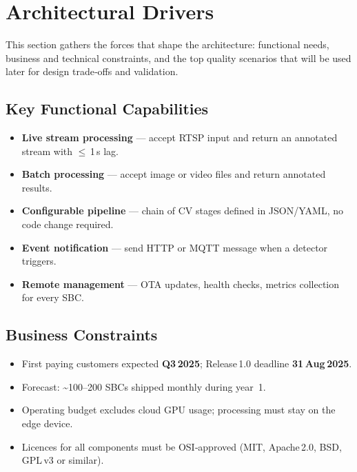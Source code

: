 \documentclass[11pt,a4paper]{article}
\begin{document}
\section{Architectural Drivers}

This section gathers the forces that shape the architecture: functional needs, business and technical constraints, and the top quality scenarios that will be used later for design trade‑offs and validation.

\subsection{Key Functional Capabilities}
\begin{itemize}
  \item \textbf{Live stream processing} — accept RTSP input and return an annotated stream with $\le$ 1 s lag.
  \item \textbf{Batch processing} — accept image or video files and return annotated results.
  \item \textbf{Configurable pipeline} — chain of CV stages defined in JSON/YAML, no code change required.
  \item \textbf{Event notification} — send HTTP or MQTT message when a detector triggers.
  \item \textbf{Remote management} — OTA updates, health checks, metrics collection for every SBC.
\end{itemize}

\subsection{Business Constraints}
\begin{itemize}
  \item First paying customers expected \textbf{Q3 2025}; Release 1.0 deadline \textbf{31 Aug 2025}.
  \item Forecast: \textasciitilde100–200 SBCs shipped monthly during year 1.
  \item Operating budget excludes cloud GPU usage; processing must stay on the edge device.
  \item Licences for all components must be OSI‑approved (MIT, Apache 2.0, BSD, GPL v3 or similar).
\end{itemize}
\end{document}
